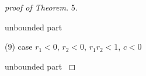 \documentclass{amsart}
\def\red{\color{red}}
\theoremstyle{definition}
\numberwithin{equation}{section}
\def\ii{{\textrm{int}}\,}
\begin{document}
\begin{proof}[proof of Theorem]
% 
% 

5. {\red unbounded part

}

\bigskip\bigskip

(9) case $r_1<0$, $r_2<0$, $r_1r_2<1$, $c<0$

{\red unbounded part
}
\bigskip\bigskip


\end{proof}
\end{document}
